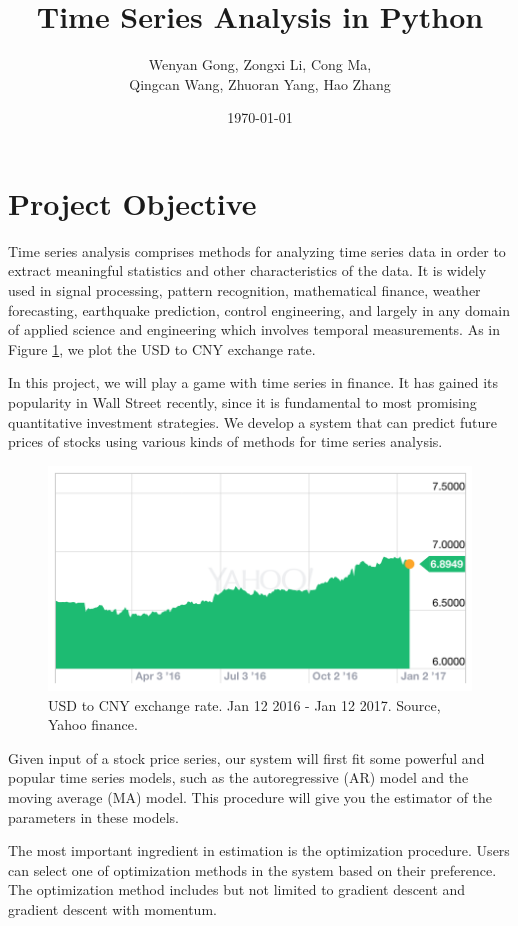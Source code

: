 \documentclass[12pt,a4paper]{article}
\title{\Huge Time Series Analysis in  Python}
\author{Wenyan Gong, Zongxi Li, Cong Ma, \\
Qingcan Wang, Zhuoran Yang, Hao Zhang}
\date{\today}
\begin{document}
\maketitle

\section{Project Objective}
Time series analysis comprises methods for analyzing time series data in order to extract meaningful statistics and other characteristics of the data. It is widely used in signal processing, pattern recognition, mathematical finance, weather forecasting, earthquake prediction, control engineering, and largely in any domain of applied science and engineering which involves temporal measurements. As in Figure \ref{fig:time_series}, we plot the USD to CNY exchange rate.

In this project, we will play a game with time series in finance. It has gained its popularity in Wall Street recently, since it is fundamental to most promising quantitative investment strategies. We develop a system that can predict future prices of stocks using various kinds of methods for time series analysis. 

\begin{figure}[H]
        \centering
     \includegraphics[width=.7\linewidth]{./Figure/USD-CNY.png}
\caption{USD to CNY exchange rate. Jan 12 2016 - Jan 12 2017. Source, Yahoo finance.}
\label{fig:time_series}
\end{figure}

Given input of a stock price series, our system will first fit some powerful and popular time series models, such as the autoregressive (AR) model and the moving average (MA) model. This procedure will give you the estimator of the parameters in these models. 

The most important ingredient in estimation is the optimization procedure. Users can select one of optimization methods in the system based on their preference. The optimization method includes but not limited to gradient descent and gradient descent with momentum.
\end{document}

